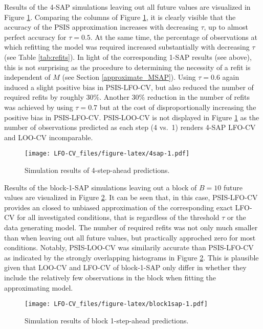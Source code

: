 \documentclass[american,]{article}
\begin{document}
Results of the 4-SAP simulations leaving out all future values are visualized in
Figure \ref{fig:4sap}. Comparing the columns of Figure \ref{fig:4sap}, it is
clearly visible that the accuracy of the PSIS approximation increases with
decreasing \(\tau\), up to almost perfect accuracy for \(\tau = 0.5\). At the same
time, the percentage of observations at which refitting the model was required
increased substantially with decreasing \(\tau\) (see Table \ref{tab:refits}). In
light of the corresponding 1-SAP results (see above), this is not surprising as
the procedure to determining the necessity of a refit is independent of \(M\) (see
Section \ref{approximate_MSAP}). Using \(\tau = 0.6\) again induced a slight
positive bias in PSIS-LFO-CV, but also reduced the number of required refits by
roughly \(30\%\). Another \(30\%\) reduction in the number of refits was achieved by
using \(\tau = 0.7\) but at the cost of disproportionally increasing the positive
bias in PSIS-LFO-CV. PSIS-LOO-CV is not displayed in Figure \ref{fig:4sap} as
the number of observations predicted as each step (4 vs.~1) renders 4-SAP LFO-CV
and LOO-CV incomparable.

\begin{figure}
\centering
\texttt{[image: LFO-CV\_files/figure-latex/4sap-1.pdf]}
\caption{\label{fig:4sap}Simulation results of 4-step-ahead predictions.}
\end{figure}

Results of the block-1-SAP simulations leaving out a block of \(B = 10\) future
values are visualized in Figure \ref{fig:block1sap}. It can be seen that, in
this case, PSIS-LFO-CV provides an closed to unbiased approximation of the
corresponding exact LFO-CV for all investigated conditions, that is regardless
of the threshold \(\tau\) or the data generating model. The number of required
refits was not only much smaller than when leaving out all future values, but
practically approched zero for most conditions. Notably, PSIS-LOO-CV was
similarily accurate than PSIS-LFO-CV as indicated by the strongly overlapping
histograms in Figure \ref{fig:block1sap}. This is plausible given that LOO-CV
and LFO-CV of block-1-SAP only differ in whether they include the relatively few
observations in the block when fitting the approximating model.

\begin{figure}
\centering
\texttt{[image: LFO-CV\_files/figure-latex/block1sap-1.pdf]}
\caption{\label{fig:block1sap}Simulation results of block 1-step-ahead predictions.}
\end{figure}
\end{document}
